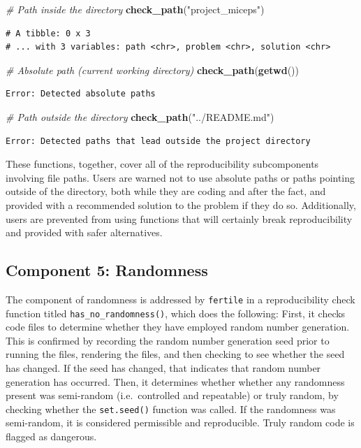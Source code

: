 \documentclass[12pt,twoside]{reedthesis}
\newenvironment{Shaded}{\begin{snugshade}}{\end{snugshade}}
\newcommand{\KeywordTok}[1]{\textcolor[rgb]{0.13,0.29,0.53}{\textbf{#1}}}
\newcommand{\StringTok}[1]{\textcolor[rgb]{0.31,0.60,0.02}{#1}}
\newcommand{\CommentTok}[1]{\textcolor[rgb]{0.56,0.35,0.01}{\textit{#1}}}
\newcommand{\NormalTok}[1]{#1}
\begin{document}
\footnotesize
\begin{Shaded}
\begin{Highlighting}[]
\CommentTok{# Path inside the directory}
\KeywordTok{check_path}\NormalTok{(}\StringTok{"project_miceps"}\NormalTok{)}
\end{Highlighting}
\end{Shaded}
\begin{verbatim}
# A tibble: 0 x 3
# ... with 3 variables: path <chr>, problem <chr>, solution <chr>
\end{verbatim}
\begin{Shaded}
\begin{Highlighting}[]
\CommentTok{# Absolute path (current working directory)}
\KeywordTok{check_path}\NormalTok{(}\KeywordTok{getwd}\NormalTok{())}
\end{Highlighting}
\end{Shaded}
\begin{verbatim}
Error: Detected absolute paths
\end{verbatim}
\begin{Shaded}
\begin{Highlighting}[]
\CommentTok{# Path outside the directory}
\KeywordTok{check_path}\NormalTok{(}\StringTok{"../README.md"}\NormalTok{)}
\end{Highlighting}
\end{Shaded}
\begin{verbatim}
Error: Detected paths that lead outside the project directory
\end{verbatim}
\normalsize

These functions, together, cover all of the reproducibility
subcomponents involving file paths. Users are warned not to use absolute
paths or paths pointing outside of the directory, both while they are
coding and after the fact, and provided with a recommended solution to
the problem if they do so. Additionally, users are prevented from using
functions that will certainly break reproducibility and provided with
safer alternatives.

\subsection{Component 5: Randomness}\label{component-5-randomness}

The component of randomness is addressed by \texttt{fertile} in a
reproducibility check function titled \texttt{has\_no\_randomness()},
which does the following: First, it checks code files to determine
whether they have employed random number generation. This is confirmed
by recording the random number generation seed prior to running the
files, rendering the files, and then checking to see whether the seed
has changed. If the seed has changed, that indicates that random number
generation has occurred. Then, it determines whether whether any
randomness present was semi-random (i.e.~controlled and repeatable) or
truly random, by checking whether the \texttt{set.seed()} function was
called. If the randomness was semi-random, it is considered permissible
and reproducible. Truly random code is flagged as dangerous.
\end{document}
